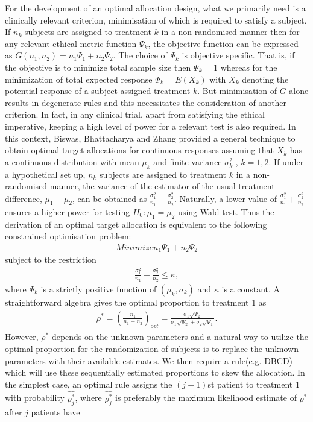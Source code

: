 For the development of an optimal allocation design, what we primarily need is a clinically relevant criterion, minimisation of which is required to satisfy a subject. If  $n_k$ subjects are assigned to treatment $k$ in a non-randomised manner then  for any relevant ethical metric function  $\Psi_{k}$,  the objective function can be expressed as $G(n_1,n_2)=n_1
\Psi_{1}+ n_2\Psi_{2}$. The choice of $\Psi_{k}$ is objective specific. That is, if the objective is to minimize total sample size then $\Psi_{k}=1$ whereas for the minimization of total expected response $\Psi_{k}=E(X_k)$ with $X_k$ denoting the potential response of a subject assigned treatment $k$. But minimisation of $G$ alone results in degenerate rules and this
necessitates the consideration of  another criterion. In fact, in any
clinical trial, apart from satisfying the ethical imperative, keeping a high level of power for a relevant test is also required. In this context, Biswas, Bhattacharya and Zhang\cite{43}  provided a general technique to obtain optimal target allocations for continuous responses assuming that $X_k$ has  a continuous distribution with mean $\mu_{k}$ and finite variance ${\sigma_{k}^{2}}$ , $k=1,2$.  If under a hypothetical set up,  $n_{k}$
subjects are assigned to treatment $k$ in a non-randomised manner, the
variance of the estimator of the usual treatment difference, $\mu_{1}-\mu_{2}$, can be obtained as $\frac{\sigma_{1}^{2}}{n_1}+\frac{\sigma_{2}^{2}}{n_2}$. Naturally, a lower value of $\frac{\sigma_{1}^{2}}{n_1}+\frac{\sigma_{2}^{2}}{n_2}$ ensures a higher power for testing $H_{0}: \mu_1=\mu_2$ using Wald test. Thus the
derivation of an optimal target allocation is equivalent to the
following constrained optimisation problem:
\begin{eqnarray*}
Minimize  n_{1}\Psi_{1}+n_{2}\Psi_{2}
 \end{eqnarray*}
subject to the restriction
\begin{eqnarray*}
\frac{\sigma_{1}^{2}}{n_{1}}+\frac{\sigma_{2}^{2}}{n_{2}}\leq \kappa,
\end{eqnarray*}
where $\Psi_{k}$ is a strictly positive function of
$(\mu_{k},\sigma_k)$ and $\kappa$ is a constant. A straightforward
algebra gives the optimal proportion to treatment 1 as
\begin{eqnarray*}
\rho^{*}=\left(\frac{n_1}{n_{1}+n_{2}}\right)_{opt}=\frac{\sigma_{1}\sqrt{\Psi_{2}}}{\sigma_{1}\sqrt{\Psi_{2}}+\sigma_{2}\sqrt{\Psi_{1}}}.
\end{eqnarray*}
However, $\rho^{*}$ depends on the unknown parameters and a natural way to utilize the optimal proportion for the randomization of subjects is to replace the unknown parameters with their available estimates. We then require a rule(e.g. DBCD) which will use these sequentially estimated proportions to skew the allocation. In the simplest case, an optimal rule assigns the $(j+1)$st patient to treatment 1 with probability $\hat{\rho_{j}^{*}}$, where $\hat{\rho^{*}_{j}}$ is preferably the maximum likelihood estimate of $\rho^{*}$ after $j$ patients have
